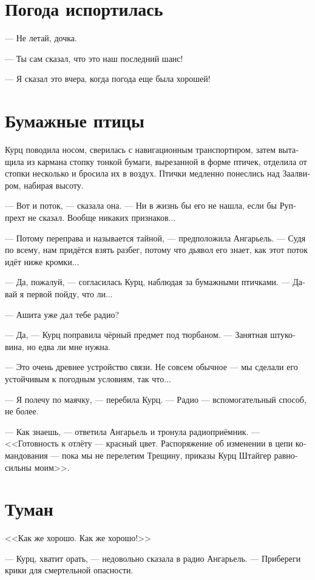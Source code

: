 \documentclass[a4paper,12pt,fleqn]{book}\usepackage{polyglossia}\setdefaultlanguage[babelshorthands=true]{russian}\setotherlanguage{english}\defaultfontfeatures{Ligatures=TeX,Mapping=tex-text}\usepackage{xcolor}\newcommand{\ml}[3]{#2}
\begin{document}
\section{Погода испортилась}

--- Не летай, дочка.

--- Ты сам сказал, что это наш последний шанс!

--- Я сказал это вчера, когда погода еще была хорошей!

\section{Бумажные птицы}

Курц поводила носом, сверилась с навигационным транспортиром, затем вытащила из кармана стопку тонкой бумаги, вырезанной в форме птичек, отделила от стопки несколько и бросила их в воздух.
Птички медленно понеслись над Заалвиром, набирая высоту.

--- Вот и поток, --- сказала она.
--- Ни в жизнь бы его не нашла, если бы Руппрехт не сказал.
Вообще никаких признаков...

--- Потому переправа и называется тайной, --- предположила Ангарьель.
--- Судя по всему, нам придётся взять разбег, потому что дьявол его знает, как этот поток идёт ниже кромки...

--- Да, пожалуй, --- согласилась Курц, наблюдая за бумажными птичками.
--- Давай я первой пойду, что ли...

--- Ашита уже дал тебе радио?

--- Да, --- Курц поправила чёрный предмет под тюрбаном.
--- Занятная штуковина, но едва ли мне нужна.

--- Это очень древнее устройство связи.
Не совсем обычное --- мы сделали его устойчивым к погодным условиям, так что...

--- Я полечу по маячку, --- перебила Курц.
--- Радио --- вспомогательный способ, не более.

--- Как знаешь, --- ответила Ангарьель и тронула радиоприёмник.
--- <<Готовность к отлёту --- красный цвет.
Распоряжение об изменении в цепи командования --- пока мы не перелетим Трещину, приказы Курц Штайгер равносильны моим>>.

\section{Туман}

<<Как же хорошо.
Как же хорошо!>>

--- Курц, хватит орать, --- недовольно сказала в радио Ангарьель.
--- Прибереги крики для смертельной опасности.
\end{document}
